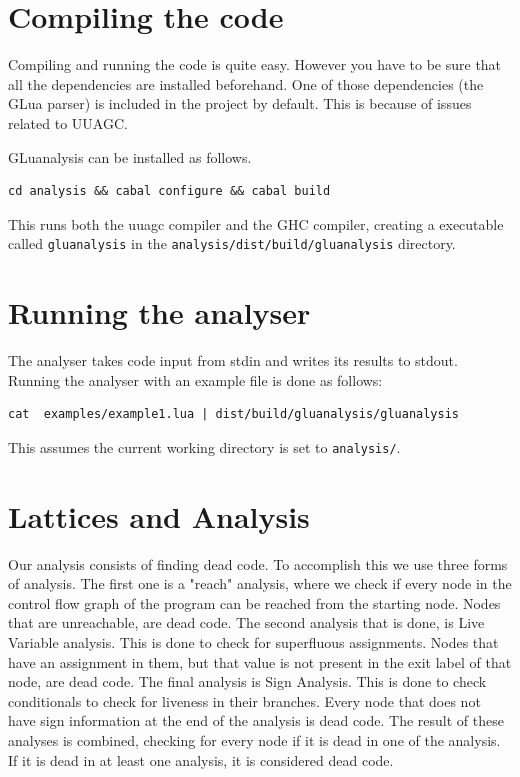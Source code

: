 \documentclass[10pt]{article}
\begin{document}
\section{Compiling the code}
Compiling and running the code is quite easy. However you have to be sure that all the dependencies are installed beforehand. One of those dependencies (the GLua parser) is included in the project by default. This is because of issues related to UUAGC.

GLuanalysis can be installed as follows. 
\begin{lstlisting}[frame=single,numbers=none,caption=Compiling the project]
cd analysis && cabal configure && cabal build
\end{lstlisting}

This runs both the uuagc compiler and the GHC compiler, creating a executable called \texttt{gluanalysis} in the \texttt{analysis/dist/build/gluanalysis} directory.

\section{Running the analyser}
The analyser takes code input from stdin and writes its results to stdout. Running the analyser with an example file is done as follows:

\begin{lstlisting}[frame=single,numbers=none,caption=Running with an example file]
cat  examples/example1.lua | dist/build/gluanalysis/gluanalysis
\end{lstlisting}

This assumes the current working directory is set to \texttt{analysis/}.

\section{Lattices and Analysis}
Our analysis consists of finding dead code. To accomplish this we use three forms of analysis. The first one is a "reach" analysis, where we check if every node in the control flow graph of the program can be reached from the starting node. Nodes that are unreachable, are dead code.
The second analysis that is done, is Live Variable analysis. This is done to check for superfluous assignments. Nodes that have an assignment in them, but that value is not present in the exit label of that node, are dead code.
The final analysis is Sign Analysis. This is done to check conditionals to check for liveness in their branches. Every node that does not have sign information at the end of the analysis is dead code.
The result of these analyses is combined, checking for every node if it is dead in one of the analysis. If it is dead in at least one analysis, it is considered dead code.
\end{document}
